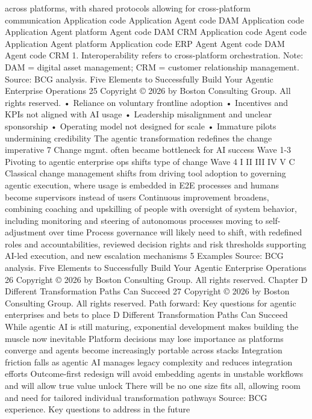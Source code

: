 across platforms, with shared protocols allowing
for cross-platform communication
Application code
Application
Agent code
DAM
Application code
Application
Agent platform
Agent code
DAM
CRM
Application code
Agent code
Application
Agent platform
Application code
ERP
Agent
Agent code
DAM
Agent code
CRM
1. Interoperability refers to cross-platform orchestration.
Note: DAM = digital asset management; CRM = customer relationship management.
Source: BCG analysis.
Five Elements to Successfully Build Your Agentic Enterprise Operations
25
Copyright © 2026 by Boston Consulting Group. All rights reserved.
•
Reliance on voluntary frontline adoption
•
Incentives and KPIs not aligned with AI usage
•
Leadership misalignment and unclear sponsorship
•
Operating model not designed for scale
•
Immature pilots undermining credibility
The agentic transformation redefines the change imperative
7
Change mgmt. often became bottleneck for AI success
            Wave 1-3
Pivoting to agentic enterprise ops shifts type of change
           Wave 4
I
II
III
IV
V
C
Classical change management shifts from driving
tool adoption to governing agentic execution, where
usage is embedded in E2E processes and humans
become supervisors instead of users
Continuous improvement broadens, combining
coaching and upskilling of people with oversight of system
behavior, including monitoring and steering of autonomous
processes moving to self-adjustment over time
Process governance will likely need to shift, with
redefined roles and accountabilities, reviewed decision
rights and risk thresholds supporting AI-led execution,
and new escalation mechanisms
5
Examples
Source: BCG analysis.
Five Elements to Successfully Build Your Agentic Enterprise Operations
26
Copyright © 2026 by Boston Consulting Group. All rights reserved.
Chapter D
Different Transformation Paths Can Succeed
27
Copyright © 2026 by Boston Consulting Group. All rights reserved.
Path forward: Key questions for agentic enterprises and bets to place
D
Different Transformation Paths Can Succeed
While agentic AI is still maturing,
exponential development makes building
the muscle now inevitable
Platform decisions
may lose importance
as platforms converge
and agents become
increasingly portable
across stacks
Integration friction falls as
agentic AI manages legacy
complexity and reduces
integration efforts
Outcome-first redesign will
avoid embedding agents in
unstable workflows and will
allow true value unlock
There will be no one
size fits all, allowing
room and need for
tailored individual
transformation
pathways
Source: BCG experience.
Key questions to address in the future
